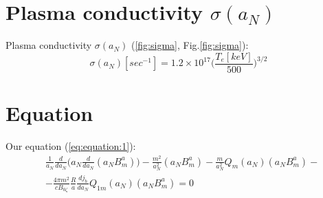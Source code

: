 \documentclass[11pt,oneside,a4paper,notitlepage]{article}
\begin{document}
\section{Plasma conductivity $\sigma(a_N)$}
Plasma conductivity $\sigma(a_N)$ (\ref{fig:sigma}, Fig.\ref{fig:sigma}):
\begin{equation}
 \sigma(a_N)[sec^{-1}]=1.2\times10^{17}\Bigg(\dfrac{T_e[keV]}{500}\Bigg)^{3/2}
\end{equation}

\section{Equation}
Our equation (\ref{eq:equation:1}):
\begin{equation} \label{eq:equation:1}
\begin{split}
&\frac{1}{a_N}\frac{d}{da_N}\Bigg( a_N \frac{d}{da_N}(a_NB_m^a) \Bigg) -\frac{m^2}{a_N^2}(a_NB_m^a)-\frac{m}{a_N^2}Q_m(a_N)(a_NB_m^a)- \\
&-\frac{4\pi m^2}{cB_{0\zeta}}\frac{R}{a}\frac{dj_b}{da_N}Q_{1m}(a_N)(a_NB_m^a)=0
\end{split}
\end{equation}
\end{document}
